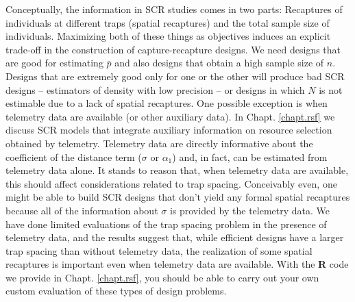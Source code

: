 Conceptually, the information in SCR studies comes in two parts:
Recaptures of individuals at different traps (spatial recaptures) and
the total sample size of individuals.  Maximizing both of these things
as objectives induces an explicit trade-off in the construction of
capture-recapture designs. We need designs that are good for
estimating $\bar{p}$ and also designs that obtain a high sample size
of $n$. Designs that are extremely good only for one or the other
will produce bad SCR designs -- estimators of density with low
precision -- or designs in which $N$ is not estimable due to a lack of
spatial recaptures.  One possible exception is when telemetry data are
available (or other auxiliary data).  In Chapt. \ref{chapt.rsf} we
discuss SCR models that integrate auxiliary information on resource
selection obtained by telemetry. Telemetry data are directly
informative about the coefficient of the distance term ($\sigma$ or
$\alpha_{1}$) and, in fact, can be estimated from telemetry data
alone. It stands to reason that, when telemetry data are available,
this should affect considerations related to trap spacing. Conceivably
even, one might be able to build SCR designs that don't yield any
formal spatial recaptures because all of the information about
$\sigma$ is provided by the telemetry data.  We have done limited
evaluations of the trap spacing problem in the presence of telemetry
data, and the results suggest that, while efficient designs have a
larger trap spacing than without telemetry data, the realization of
some spatial recaptures is important even when telemetry data are
available. With the {\bf R} code we provide in
Chapt. \ref{chapt.rsf}, you should be able to carry out your own
custom evaluation of these types of design problems.



















